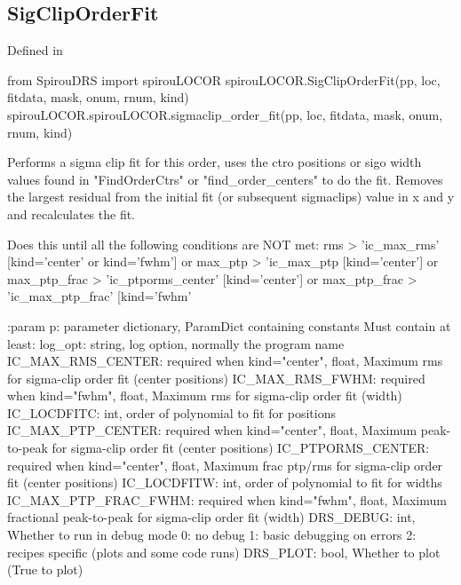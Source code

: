 \noindent\begin{minipage}{\textwidth}
\subsection{SigClipOrderFit}

Defined in \spirouLOCOR{}

\begin{pythonbox}
from SpirouDRS import spirouLOCOR
spirouLOCOR.SigClipOrderFit(pp, loc, fitdata, mask, onum, rnum, kind)
spirouLOCOR.spirouLOCOR.sigmaclip_order_fit(pp, loc, fitdata, mask, onum, rnum, kind)
\end{pythonbox}

\begin{pythondocstring}
Performs a sigma clip fit for this order, uses the ctro positions or
sigo width values found in "FindOrderCtrs" or "find_order_centers" to do
the fit. Removes the largest residual from the initial fit (or subsequent
sigmaclips) value in x and y and recalculates the fit.

Does this until all the following conditions are NOT met:
       rms > 'ic_max_rms'   [kind='center' or kind='fwhm']
    or max_ptp > 'ic_max_ptp [kind='center']
    or max_ptp_frac > 'ic_ptporms_center'   [kind='center']
    or max_ptp_frac > 'ic_max_ptp_frac'     [kind='fwhm'

:param p: parameter dictionary, ParamDict containing constants
    Must contain at least:
            log_opt: string, log option, normally the program name
            IC_MAX_RMS_CENTER: required when kind="center", float, Maximum
                               rms for sigma-clip order fit (center
                               positions)
            IC_MAX_RMS_FWHM: required when kind="fwhm", float, Maximum
                             rms for sigma-clip order fit (width)
            IC_LOCDFITC: int, order of polynomial to fit for positions
            IC_MAX_PTP_CENTER: required when kind="center", float, Maximum
                               peak-to-peak for sigma-clip order fit
                               (center positions)
            IC_PTPORMS_CENTER: required when kind="center", float, Maximum
                               frac ptp/rms for sigma-clip order fit
                               (center positions)
            IC_LOCDFITW: int, order of polynomial to fit for widths
            IC_MAX_PTP_FRAC_FWHM: required when kind="fwhm", float, Maximum
                                  fractional peak-to-peak for sigma-clip
                                  order fit (width)
            DRS_DEBUG: int, Whether to run in debug mode
                            0: no debug
                            1: basic debugging on errors
                            2: recipes specific (plots and some code runs)
            DRS_PLOT: bool, Whether to plot (True to plot)


\end{pythondocstring}
\end{minipage}
